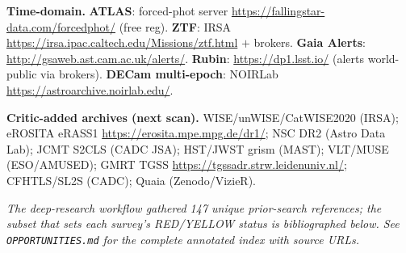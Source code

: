 \documentclass[11pt,letterpaper]{article}
\newcommand{\survey}[1]{\textbf{#1}}
\begin{document}
\smallskip\noindent\textbf{Time-domain.}
\survey{ATLAS}: forced-phot server \url{https://fallingstar-data.com/forcedphot/} (free reg).
\survey{ZTF}: IRSA \url{https://irsa.ipac.caltech.edu/Missions/ztf.html} $+$ brokers.
\survey{Gaia Alerts}: \url{http://gsaweb.ast.cam.ac.uk/alerts/}.
\survey{Rubin}: \url{https://dp1.lsst.io/} (alerts world-public via brokers).
\survey{DECam multi-epoch}: NOIRLab \url{https://astroarchive.noirlab.edu/}.

\smallskip\noindent\textbf{Critic-added archives (next scan).}
WISE/unWISE/CatWISE2020 (IRSA); eROSITA eRASS1 \url{https://erosita.mpe.mpg.de/dr1/};
NSC DR2 (Astro Data Lab); JCMT S2CLS (CADC JSA); HST/JWST grism (MAST); VLT/MUSE (ESO/AMUSED);
GMRT TGSS \url{https://tgssadr.strw.leidenuniv.nl/}; CFHTLS/SL2S (CADC); Quaia (Zenodo/VizieR).

\bigskip
\noindent\emph{The deep-research workflow gathered 147 unique prior-search references;
the subset that sets each survey's RED/YELLOW status is bibliographed below. See
\texttt{OPPORTUNITIES.md} for the complete annotated index with source URLs.}



\end{document}
